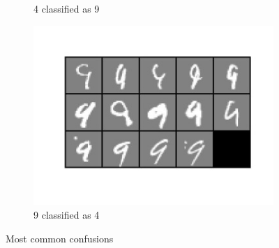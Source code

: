 \documentclass[conference]{IEEEtran}
\begin{document}
\begin{figure}[tmbh]
\begin{subfigure}{.23\textwidth}
  \caption{4 classified as 9}
  \end{subfigure}%
\begin{subfigure}{.23\textwidth}
  \centering
  \includegraphics[width=.8\linewidth]{94.jpg}
  \caption{9 classified as 4}
 \end{subfigure}
 \caption{Most common confusions}
\label{figure:SomeConfusion}
\end{figure} 
\end{document}
